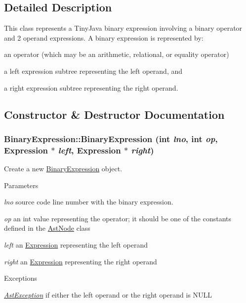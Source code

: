 \subsection{Detailed Description}
This class represents a TinyJava binary expression involving a binary operator and 2 operand expressions. A binary expression is represented by:
\begin{DoxyItemize}
\item an operator (which may be an arithmetic, relational, or equality operator)
\item a left expression subtree representing the left operand, and
\item a right expression subtree representing the right operand. 
\end{DoxyItemize}

\subsection{Constructor \& Destructor Documentation}
\hypertarget{classBinaryExpression_af36e7f9f5222b93f030748384c631eb0}{
\subsubsection[{BinaryExpression}]{\setlength{\rightskip}{0pt plus 5cm}BinaryExpression::BinaryExpression (int {\em lno}, \/  int {\em op}, \/  {\bf Expression} $\ast$ {\em left}, \/  {\bf Expression} $\ast$ {\em right})}}
\label{classBinaryExpression_af36e7f9f5222b93f030748384c631eb0}
Create a new \hyperlink{classBinaryExpression}{BinaryExpression} object.


\begin{DoxyParams}{Parameters}
\item[{\em lno}]source code line number with the binary expression. \item[{\em op}]an int value representing the operator; it should be one of the constants defined in the \hyperlink{classAstNode}{AstNode} class \item[{\em left}]an \hyperlink{classExpression}{Expression} representing the left operand \item[{\em right}]an \hyperlink{classExpression}{Expression} representing the right operand \end{DoxyParams}

\begin{DoxyExceptions}{Exceptions}
\item[{\em \hyperlink{classAstException}{AstException}}]if either the left operand or the right operand is NULL \end{DoxyExceptions}



